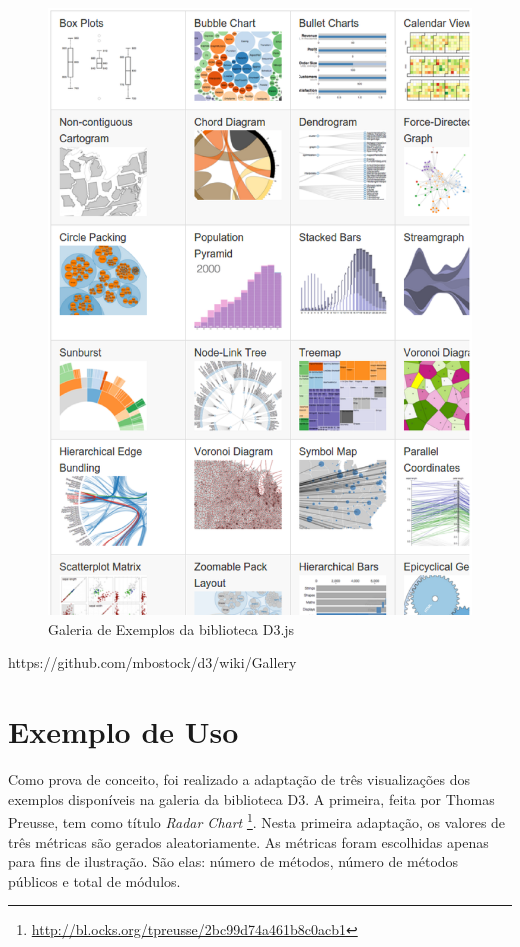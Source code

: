 \begin{figure}[!htb]
	\centering
    \includegraphics[keepaspectratio=true,scale=0.5]
    {figuras/d3_gallery.eps}
  \caption{Galeria de Exemplos da biblioteca D3.js \cite{galleryD3}}
  \label{fig:d3_gallery}
\end{figure}

https://github.com/mbostock/d3/wiki/Gallery

\section{Exemplo de Uso}


Como prova de conceito, foi realizado a adaptação de três visualizações dos
exemplos disponíveis na galeria da biblioteca D3. A primeira, feita por Thomas
Preusse, tem como título \textit{Radar Chart}
\footnote{\url{http://bl.ocks.org/tpreusse/2bc99d74a461b8c0acb1}}. Nesta
primeira adaptação, os valores de três métricas são gerados aleatoriamente. As
métricas foram escolhidas apenas para fins de ilustração. São elas: número de
métodos, número de métodos públicos e total de módulos.


